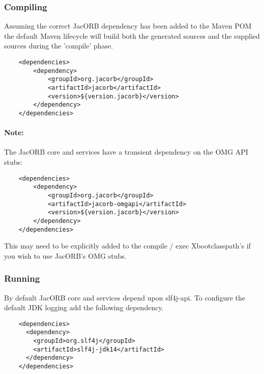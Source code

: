 \subsubsection{Compiling}
Assuming the correct JacORB dependency has been added to the Maven POM the default Maven lifecycle will build both
the generated sources and the supplied sources during the 'compile' phase.
\begin{verbatim}
    <dependencies>
        <dependency>
            <groupId>org.jacorb</groupId>
            <artifactId>jacorb</artifactId>
            <version>${version.jacorb}</version>
        </dependency>
    </dependencies>
\end{verbatim}

\paragraph{Note:}
The JacORB core and services have a transient dependency on the OMG API stubs:

\begin{verbatim}
    <dependencies>
        <dependency>
            <groupId>org.jacorb</groupId>
            <artifactId>jacorb-omgapi</artifactId>
            <version>${version.jacorb}</version>
        </dependency>
    </dependencies>
\end{verbatim}

This may need to be explicitly added to the compile / exec Xbootclasspath's if
you wish to use JacORB's OMG stubs.

\subsubsection{Running}
By default JacORB core and services depend upon slf4j-api. To configure the default JDK logging
add the following dependency.
\begin{verbatim}
    <dependencies>
      <dependency>
        <groupId>org.slf4j</groupId>
        <artifactId>slf4j-jdk14</artifactId>
      </dependency>
    </dependencies>
\end{verbatim}

